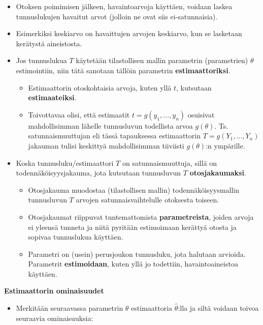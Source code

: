 \documentclass[
]{book}
\providecommand{\tightlist}{%
  \setlength{\itemsep}{0pt}\setlength{\parskip}{0pt}}
\begin{document}
\begin{itemize}
\item
  Otoksen poimimisen jälkeen, havaintoarvoja käyttäen, voidaan laskea tunnuslukujen havaitut arvot (jolloin ne ovat siis ei-satunnaisia).
\item
  Esimerkiksi keskiarvo on havaittujen arvojen keskiarvo, kun se lasketaan kerätystä aineistosta.
\item
  Jos tunnuslukua \(T\) käytetään tilastollisen mallin parametrin (parametrien) \(\theta\) estimointiin, niin tätä sanotaan tällöin parametrin \textbf{estimaattoriksi}.

  \begin{itemize}
  \tightlist
  \item
    Estimaattorin otoskohtaisia arvoja, kuten yllä \(t\), kutsutaan \textbf{estimaateiksi}.
  \item
    Toivottavaa olisi, että estimaatit \(t = g(y_1, \ldots, y_n)\) osuisivat mahdollisimman lähelle tunnusluvun todellista arvoa \(g(\theta)\). Ts. satunnaismuuttujan eli tässä tapauksessa estimaattorin \(T=g(Y_1, \ldots, Y_n)\) jakauman tulisi keskittyä mahdollisimman tiiviisti \(g(\theta)\):n ympärille.
  \end{itemize}
\item
  Koska tunnusluku/estimaattori \(T\) on satunnaismuuttuja, sillä on todennäköisyysjakauma, jota kutsutaan tunnusluvun \(T\) \textbf{otosjakaumaksi}.

  \begin{itemize}
  \tightlist
  \item
    Otosjakauma muodostaa (tilastollisen mallin) todennäköisyysmallin tunnusluvun \(T\) arvojen satunnaisvaihtelulle otoksesta toiseen.
  \item
    Otosjakaumat riippuvat tuntemattomista \textbf{parametreista}, joiden arvoja ei yleensä tunneta ja niitä pyritään estimoimaan kerättyä otosta ja sopivaa tunnuslukua käyttäen.
  \item
    Parametri on (usein) perusjoukon tunnusluku, jota halutaan arvioida. Parametrit \textbf{estimoidaan}, kuten yllä jo todettiin, havaintoaineistoa käyttäen.
  \end{itemize}
\end{itemize}

\hfill\break

\textbf{Estimaattorin ominaisuudet}

\begin{itemize}
\tightlist
\item
  Merkitään seuraavassa parametrin \(\theta\) estimaattoria \(\widehat{\theta}\):lla ja siltä voidaan toivoa seuraavia ominaisuuksia:
\end{itemize}
\end{document}
